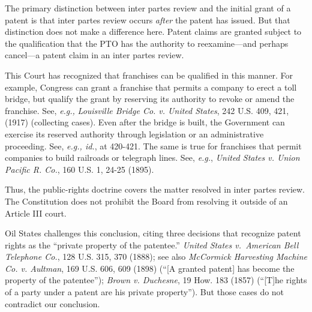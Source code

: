 The primary distinction between inter partes review and the initial grant of a
patent is that inter partes review occurs \textit{after} the patent has issued.
But that distinction does not make a difference here. Patent claims are granted subject to the qualification that the PTO has
the authority to reexamine---and perhaps cancel---a patent claim in an inter
partes review.

This Court has recognized that franchises can be qualified in this manner. For
example, Congress can grant a franchise that permits a company to erect a toll
bridge, but qualify the grant by reserving its authority to revoke or amend the
franchise. See, \textit{e.g., }\textit{Louisville Bridge Co. v. United States},
242 U.S. 409, 421, (1917) (collecting cases). Even after the bridge is built,
the Government can exercise its reserved authority through legislation or an
administrative proceeding. See, \textit{e.g., id.}, at 420-421. The same is true
for franchises that permit companies to build railroads or telegraph lines. See,
\textit{e.g.}, \textit{United States v. Union Pacific R. Co.}, 160 U.S. 1, 24-25
(1895).

Thus, the public-rights doctrine covers the matter resolved in inter partes
review. The Constitution does not prohibit the Board from resolving it outside
of an Article III court.



Oil States challenges this conclusion, citing three decisions that recognize
patent rights as the ``private property of the patentee.'' \textit{United States
v.~American Bell Telephone Co.}, 128 U.S. 315, 370 (1888); see also
\textit{McCormick Harvesting Machine Co. v. Aultman}, 169 U.S. 606, 609 (1898)
(``[A granted patent] has become the property of the patentee''); \textit{Brown
v. Duchesne}, 19 How. 183 (1857) (``[T]he rights of a party
under a patent are his private property''). But those cases do not contradict
our conclusion.

